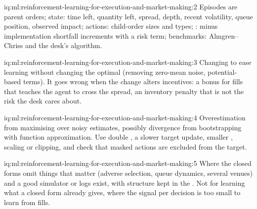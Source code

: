 \begin{solution}{iq:ml:reinforcement-learning-for-execution-and-market-making:2}
Episodes are parent orders; state: time left, quantity left, spread, depth, recent volatility, queue position, observed impact;
actions: child-order sizes and types; : minus implementation shortfall increments with a risk term; benchmarks:
Almgren--Chriss and the desk's algorithm.
\end{solution}

\begin{solution}{iq:ml:reinforcement-learning-for-execution-and-market-making:3}
Changing  to ease learning without changing the optimal  (removing zero-mean noise, potential-based terms). It goes
wrong when the change alters incentives: a bonus for fills that teaches the agent to cross the spread, an inventory penalty that
is not the risk the desk cares about.
\end{solution}

\begin{solution}{iq:ml:reinforcement-learning-for-execution-and-market-making:4}
Overestimation from maximising over noisy estimates, possibly divergence from bootstrapping with function approximation.
Use double , a slower target update, smaller ,  scaling or clipping, and check that masked actions
are excluded from the target.
\end{solution}

\begin{solution}{iq:ml:reinforcement-learning-for-execution-and-market-making:5}
Where the closed forms omit things that matter (adverse selection, queue dynamics, several venues) and a good simulator or
logs exist, with structure kept in the . Not for learning what a closed form already gives, where the signal per decision
is too small to learn from fills.
\end{solution}

